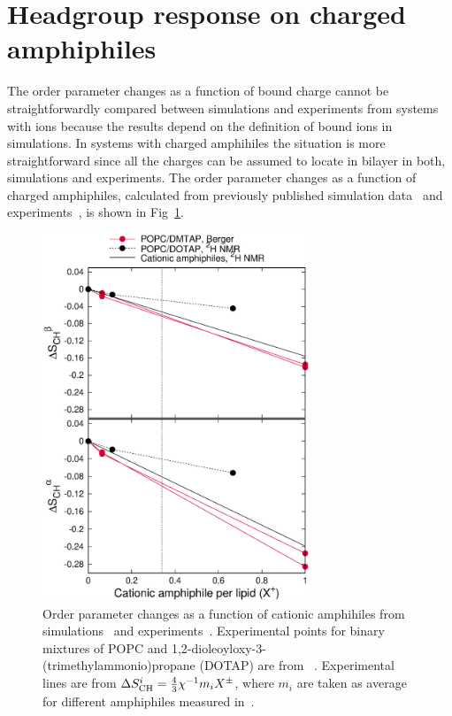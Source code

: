 \documentclass[pre,aps,floatfix,authordate1-4,twocolumn]{revtex4-1}
\begin{document}
\section{Headgroup response on charged amphiphiles}
The order parameter changes as a function of bound charge cannot be straightforwardly
compared between simulations and experiments from systems with ions because the 
results depend on the definition of bound ions in simulations. In systems with charged
amphihiles the situation is more straightforward since all the charges can be assumed 
to locate in bilayer in both, simulations and experiments. The order parameter changes as a 
function of charged amphiphiles, calculated from previously published simulation 
data~\cite{miettinen09,DMPC_DMTAP0mol,DMPC_DMTAP6mol,DMPC_DMTAP50mol} and
experiments~\cite{scherer89,franzin98}, is shown in Fig~\ref{DMPC_DMTAP}.
\begin{figure}[]
  \centering
  \includegraphics[width=8cm]{../Fig/OrderParameterDMPC_DMTAP.eps} 
  \caption{\label{DMPC_DMTAP}
    Order parameter changes as a function of cationic amphihiles from simulations~\cite{miettinen09,DMPC_DMTAP0mol,DMPC_DMTAP6mol,DMPC_DMTAP50mol} 
    and experiments~\cite{scherer89,franzin98}. Experimental points for binary mixtures of POPC and 1,2-dioleoyloxy-3-(trimethylammonio)propane (DOTAP)
    are from ~\cite{franzin98}. Experimental lines are from $\Delta S_{\rm{CH}}^{i}=\frac{4}{3}\chi^{-1}m_i X^\pm$, where $m_i$ are taken as average
    for different amphiphiles measured in~\cite{scherer89}.
}
\end{figure}
\end{document}
